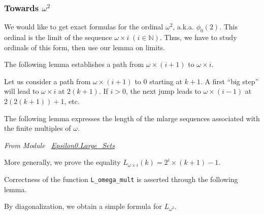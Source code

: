 
\vspace{-16pt}


\subsubsection{Towards  \texorpdfstring{$\omega^2$}{omega*omega}}

We would like to get exact formulas for the ordinal $\omega^2$, a.k.a.
$\phi_0(2)$. This ordinal is the limit of the sequence $\omega\times i\;(i \in \mathbb{N})$. Thus, we have to study ordinals of this form, then use 
our lemma on limits.

The following lemma establishes a path from $\omega\times ( i+1)$ to
$\omega \times i$.



Let us consider a path from  $\omega\times(i+1)$ to $0$ starting at $k+1$.
A first ``big step'' will lead to $\omega\times i$ at $2(k+1)$. If $i>0$, the
next jump leads to $\omega\times(i-1)$ at $2(2(k+1))+1$, etc.

The following lemma expresses the length of the mlarge sequences associated with the finite multiples of $\omega$.




\emph{From Module~ \href{../theories/html/hydras.Epsilon0.Large_Sets.html\#L_omega_mult}{Epsilon0.Large\_Sets}}



More generally, we prove the equality $L_{\omega\times i}(k)=2^i\times(k+1)-1$.




Correctness of the function \texttt{L\_omega\_mult} is asserted through the following lemma.




By diagonalization, we obtain a simple formula for $L_{\omega^2}$.













